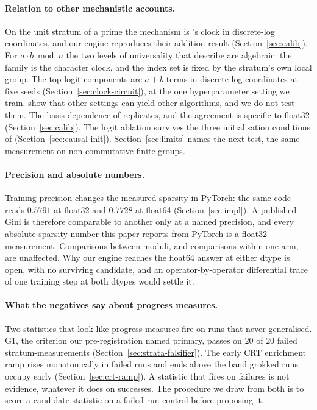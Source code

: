 \paragraph{Relation to other mechanistic accounts.} On the unit stratum of a prime the
mechanism is \citet{nanda2023progress}'s clock in discrete-log coordinates, and our engine
reproduces their addition result (Section~\ref{sec:calib}). For $a \cdot b \bmod n$ the two
levels of universality that \citet{chughtai2023toy} describe are algebraic: the family is the
character clock, and the index set is fixed by the stratum's own local group. The top logit
components are $a+b$ terms in discrete-log coordinates at five seeds
(Section~\ref{sec:clock-circuit}), at the one hyperparameter setting we train.
\citet{zhong2023clock} show that other settings can yield other algorithms, and we do not
test them. The basis dependence of \citet{nguyen2026dlogclock} replicates, and the agreement
is specific to float32 (Section~\ref{sec:calib}). The logit ablation survives the three
initialisation conditions of \citet{kunin2024getrich} (Section~\ref{sec:causal-init}).
Section~\ref{sec:limits} names the next test, the same measurement on non-commutative finite
groups.

\paragraph{Precision and absolute numbers.} Training precision changes the measured sparsity
in PyTorch: the same code reads $0.5791$ at float32 and $0.7728$ at float64
(Section~\ref{sec:impl}). A published Gini is therefore comparable to another only at a named
precision, and every absolute sparsity number this paper reports from PyTorch is a float32 measurement.
Comparisons between moduli, and comparisons within one arm, are unaffected. Why our engine
reaches the float64 answer at either dtype is open, with no surviving candidate, and an
operator-by-operator differential trace of one training step at both dtypes would settle it.

\paragraph{What the negatives say about progress measures.} Two statistics that look like
progress measures fire on runs that never generalised. G1, the criterion our pre-registration
named primary, passes on $20$ of $20$ failed stratum-measurements
(Section~\ref{sec:strata-falsifier}). The early CRT enrichment ramp rises monotonically in
failed runs and ends above the band grokked runs occupy early (Section~\ref{sec:crt-ramp}). A
statistic that fires on failures is not evidence, whatever it does on successes. The
procedure we draw from both is to score a candidate statistic on a failed-run control before
proposing it.

